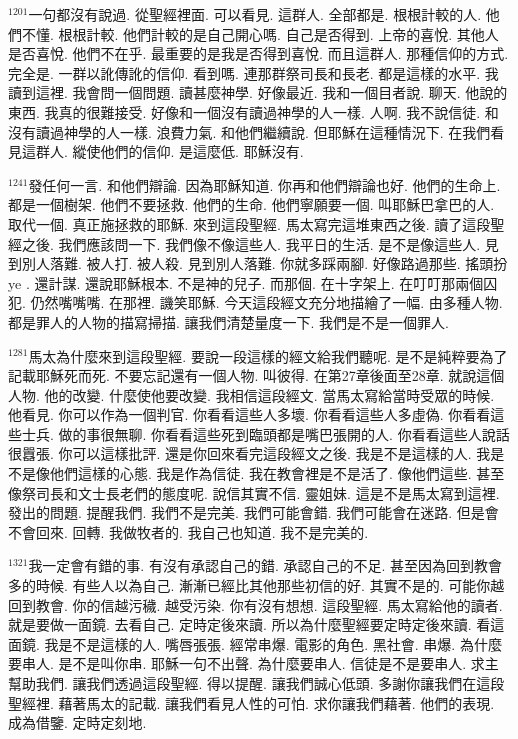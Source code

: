 \documentclass{book}
\begin{document}
$^{1201}$一句都沒有說過.
從聖經裡面.
可以看見.
這群人.
全部都是.
根根計較的人.
他們不懂.
根根計較.
他們計較的是自己開心嗎.
自己是否得到.
上帝的喜悅.
其他人是否喜悅.
他們不在乎.
最重要的是我是否得到喜悅.
而且這群人.
那種信仰的方式.
完全是.
一群以訛傳訛的信仰.
看到嗎.
連那群祭司長和長老.
都是這樣的水平.
我讀到這裡.
我會問一個問題.
讀甚麼神學.
好像最近.
我和一個目者說.
聊天.
他說的東西.
我真的很難接受.
好像和一個沒有讀過神學的人一樣.
人啊.
我不說信徒.
和沒有讀過神學的人一樣.
浪費力氣.
和他們繼續說.
但耶穌在這種情況下.
在我們看見這群人.
縱使他們的信仰.
是這麼低.
耶穌沒有.

$^{1241}$發任何一言.
和他們辯論.
因為耶穌知道.
你再和他們辯論也好.
他們的生命上.
都是一個樹架.
他們不要拯救.
他們的生命.
他們寧願要一個.
叫耶穌巴拿巴的人.
取代一個.
真正施拯救的耶穌.
來到這段聖經.
馬太寫完這堆東西之後.
讀了這段聖經之後.
我們應該問一下.
我們像不像這些人.
我平日的生活.
是不是像這些人.
見到別人落難.
被人打.
被人殺.
見到別人落難.
你就多踩兩腳.
好像路過那些.
搖頭扮ye .
還計謀.
還說耶穌根本.
不是神的兒子.
而那個.
在十字架上.
在叮叮那兩個囚犯.
仍然嘴嘴嘴.
在那裡.
譏笑耶穌.
今天這段經文充分地描繪了一幅.
由多種人物.
都是罪人的人物的描寫掃描.
讓我們清楚量度一下.
我們是不是一個罪人.

$^{1281}$馬太為什麼來到這段聖經.
要說一段這樣的經文給我們聽呢.
是不是純粹要為了記載耶穌死而死.
不要忘記還有一個人物.
叫彼得.
在第27章後面至28章.
就說這個人物.
他的改變.
什麼使他要改變.
我相信這段經文.
當馬太寫給當時受眾的時候.
他看見.
你可以作為一個判官.
你看看這些人多壞.
你看看這些人多虛偽.
你看看這些士兵.
做的事很無聊.
你看看這些死到臨頭都是嘴巴張開的人.
你看看這些人說話很囂張.
你可以這樣批評.
還是你回來看完這段經文之後.
我是不是這樣的人.
我是不是像他們這樣的心態.
我是作為信徒.
我在教會裡是不是活了.
像他們這些.
甚至像祭司長和文士長老們的態度呢.
說信其實不信.
靈姐妹.
這是不是馬太寫到這裡.
發出的問題.
提醒我們.
我們不是完美.
我們可能會錯.
我們可能會在迷路.
但是會不會回來.
回轉.
我做牧者的.
我自己也知道.
我不是完美的.

$^{1321}$我一定會有錯的事.
有沒有承認自己的錯.
承認自己的不足.
甚至因為回到教會多的時候.
有些人以為自己.
漸漸已經比其他那些初信的好.
其實不是的.
可能你越回到教會.
你的信越污穢.
越受污染.
你有沒有想想.
這段聖經.
馬太寫給他的讀者.
就是要做一面鏡.
去看自己.
定時定後來讀.
所以為什麼聖經要定時定後來讀.
看這面鏡.
我是不是這樣的人.
嘴唇張張.
經常串爆.
電影的角色.
黑社會.
串爆.
為什麼要串人.
是不是叫你串.
耶穌一句不出聲.
為什麼要串人.
信徒是不是要串人.
求主幫助我們.
讓我們透過這段聖經.
得以提醒.
讓我們誠心低頭.
多謝你讓我們在這段聖經裡.
藉著馬太的記載.
讓我們看見人性的可怕.
求你讓我們藉著.
他們的表現.
成為借鑒.
定時定刻地.
\end{document}
